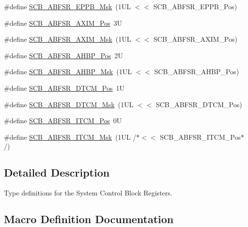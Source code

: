 \begin{DoxyCompactItemize}
\#define \mbox{\hyperlink{group__CMSIS__SCB_gac7bbc98af76d3de2713a0eb0c6c2e613}{S\+C\+B\+\_\+\+A\+B\+F\+S\+R\+\_\+\+E\+P\+P\+B\+\_\+\+Msk}}~(1\+U\+L $<$$<$ S\+C\+B\+\_\+\+A\+B\+F\+S\+R\+\_\+\+E\+P\+P\+B\+\_\+\+Pos)
\item 
\#define \mbox{\hyperlink{group__CMSIS__SCB_ga48c7a6de20e2823c0dc74d78c5ef7992}{S\+C\+B\+\_\+\+A\+B\+F\+S\+R\+\_\+\+A\+X\+I\+M\+\_\+\+Pos}}~3U
\item 
\#define \mbox{\hyperlink{group__CMSIS__SCB_gac24348e5ec8392f4a076c7ba690aae48}{S\+C\+B\+\_\+\+A\+B\+F\+S\+R\+\_\+\+A\+X\+I\+M\+\_\+\+Msk}}~(1\+U\+L $<$$<$ S\+C\+B\+\_\+\+A\+B\+F\+S\+R\+\_\+\+A\+X\+I\+M\+\_\+\+Pos)
\item 
\#define \mbox{\hyperlink{group__CMSIS__SCB_ga5c97d4cc05972dc80963e74eb2332841}{S\+C\+B\+\_\+\+A\+B\+F\+S\+R\+\_\+\+A\+H\+B\+P\+\_\+\+Pos}}~2U
\item 
\#define \mbox{\hyperlink{group__CMSIS__SCB_gabfc67aa93bca5ddd4b0f0a47b372383e}{S\+C\+B\+\_\+\+A\+B\+F\+S\+R\+\_\+\+A\+H\+B\+P\+\_\+\+Msk}}~(1\+U\+L $<$$<$ S\+C\+B\+\_\+\+A\+B\+F\+S\+R\+\_\+\+A\+H\+B\+P\+\_\+\+Pos)
\item 
\#define \mbox{\hyperlink{group__CMSIS__SCB_ga46e22bfb92f4344807714dfa987b7cf3}{S\+C\+B\+\_\+\+A\+B\+F\+S\+R\+\_\+\+D\+T\+C\+M\+\_\+\+Pos}}~1U
\item 
\#define \mbox{\hyperlink{group__CMSIS__SCB_ga0f48b9b3b5e79c83383ff9506a75f423}{S\+C\+B\+\_\+\+A\+B\+F\+S\+R\+\_\+\+D\+T\+C\+M\+\_\+\+Msk}}~(1\+U\+L $<$$<$ S\+C\+B\+\_\+\+A\+B\+F\+S\+R\+\_\+\+D\+T\+C\+M\+\_\+\+Pos)
\item 
\#define \mbox{\hyperlink{group__CMSIS__SCB_gaf7c22a977aed73cd51317c25286e81c6}{S\+C\+B\+\_\+\+A\+B\+F\+S\+R\+\_\+\+I\+T\+C\+M\+\_\+\+Pos}}~0U
\item 
\#define \mbox{\hyperlink{group__CMSIS__SCB_gaa8cd31cf3adbe7445c733c0a0a4779da}{S\+C\+B\+\_\+\+A\+B\+F\+S\+R\+\_\+\+I\+T\+C\+M\+\_\+\+Msk}}~(1\+U\+L /$\ast$$<$$<$ S\+C\+B\+\_\+\+A\+B\+F\+S\+R\+\_\+\+I\+T\+C\+M\+\_\+\+Pos$\ast$/)
\end{DoxyCompactItemize}


\subsection{Detailed Description}
Type definitions for the System Control Block Registers. 



\subsection{Macro Definition Documentation}
\mbox{\label{group__CMSIS__SCB_gabfc67aa93bca5ddd4b0f0a47b372383e}} 
